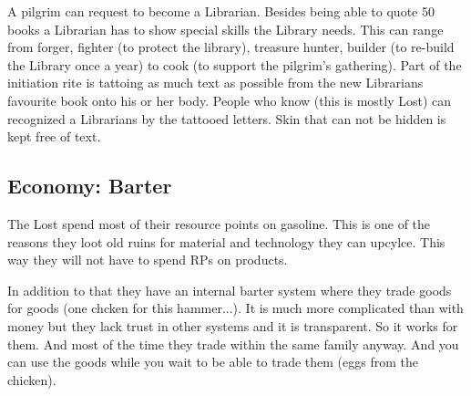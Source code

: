 A pilgrim can request to become a Librarian. Besides being able to quote 50 books a Librarian has to show special skills the Library needs. This can range from forger, fighter (to protect the library), treasure hunter, builder (to re-build the Library once a year) to cook (to support the pilgrim's gathering).
Part of the initiation rite is tattoing as much text as possible from the new Librarians favourite book onto his or her body. People who know (this is mostly Lost) can recognized a Librarians by the tattooed letters.
Skin that can not be hidden is kept free of text.

\subsection{Economy: Barter}
\label{sec:Barter}
The Lost spend most of their resource points on gasoline. This is one of the reasons they loot old ruins for material and technology they can upcylce. This way they will not have to spend RPs on products.

In addition to that they have an internal barter system where they trade goods for goods (one chcken for this hammer...).
It is much more complicated than with money but they lack trust in other systems and it is transparent. So it works for them. And most of the time they trade within the same family anyway.
And you can use the goods while you wait to be able to trade them (eggs from the chicken).


